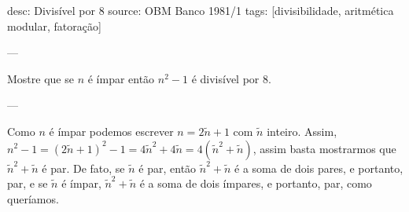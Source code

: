 desc: Divisível por 8
source:  OBM Banco 1981/1
tags:  [divisibilidade, aritmética modular, fatoração]

---

Mostre que se $n$ é ímpar então $n^2 - 1$ é divisível por $8$.

---

Como $n$ é ímpar podemos escrever $n = 2 \tilde{n} + 1$ com $\tilde{n}$ inteiro. Assim, $n^2 - 1 = (2 \tilde{n} + 1)^2 - 1 = 4 \tilde{n}^2 + 4 \tilde{n} = 4 (\tilde{n}^2 + \tilde{n})$, assim basta mostrarmos que $\tilde{n}^2 + \tilde{n}$ é par. De fato, se $\tilde{n}$ é par, então $\tilde{n}^2 + \tilde{n}$ é a soma de dois pares, e portanto, par, e se $\tilde{n}$ é ímpar, $\tilde{n}^2 + \tilde{n}$ é a soma de dois ímpares, e portanto, par, como queríamos.
